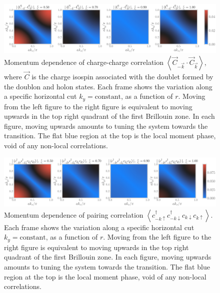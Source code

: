 \documentclass[reprint,hidelinks]{revtex4-2}
\begin{document}
\begin{widetext}
\begin{figure}[!htb]
\centering
\includegraphics[width=\textwidth]{charge_rspace_all.pdf}
\caption{Momentum dependence of charge-charge correlation \(\left<\vec{C}_{-\vec k}\cdot\vec{C}_{\vec k} \right>\), where \(\vec C\) is the charge isospin associated with the doublet formed by the doublon and holon states. Each frame shows the variation along a specific horizontal cut \(k_y=\text{constant}\), as a function of \(r\). Moving from the left figure to the right figure is equivalent to moving upwards in the top right quadrant of the first Brillouin zone. In each figure, moving upwards amounts to tuning the system towards the transition. The flat blue region at the top is the local moment phase, void of any non-local correlations.}
\label{charge_kspace}
\end{figure}

\begin{figure}[!htb]
\includegraphics[width=\textwidth]{pair_rspace_all.pdf}
\caption{Momentum dependence of pairing correlation \(\left<c^\dagger_{-k\uparrow}c^\dagger_{-k\downarrow}c_{k\downarrow}c_{k\uparrow}\right>\). Each frame shows the variation along a specific horizontal cut \(k_y=\text{constant}\), as a function of \(r\). Moving from the left figure to the right figure is equivalent to moving upwards in the top right quadrant of the first Brillouin zone. In each figure, moving upwards amounts to tuning the system towards the transition. The flat blue region at the top is the local moment phase, void of any non-local correlations.}
\label{pair_kspace}
\end{figure}


\end{widetext}
\end{document}
